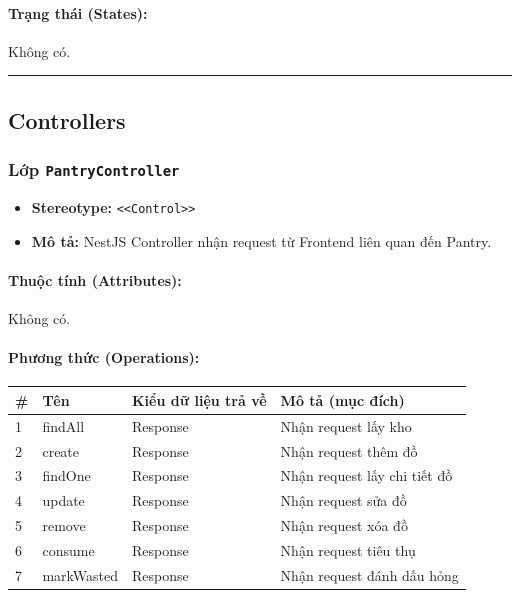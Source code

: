 \documentclass[12pt,a4paper]{article}
\begin{document}
\paragraph{Trạng thái (States):}
Không có.

\vskip 0.5cm
\noindent\rule{\textwidth}{0.5pt}
\vskip 0.5cm

\subsection{Controllers}


\subsubsection{Lớp \texttt{PantryController}}

\begin{itemize}[leftmargin=*]
    \item \textbf{Stereotype:} \texttt{\textless{}\textless{}Control\textgreater{}\textgreater{}}
    \item \textbf{Mô tả:} NestJS Controller nhận request từ Frontend liên quan đến Pantry.
\end{itemize}

\paragraph{Thuộc tính (Attributes):}
Không có.

\paragraph{Phương thức (Operations):}
\begin{longtable}{|p{0.6cm}|p{5.0cm}|p{2.8cm}|p{5.4cm}|}
\hline
\textbf{\#} & \textbf{Tên} & \textbf{Kiểu dữ liệu trả về} & \textbf{Mô tả (mục đích)} \\ \hline
\endhead
1 & findAll & Response & Nhận request lấy kho \\ \hline
2 & create & Response & Nhận request thêm đồ \\ \hline
3 & findOne & Response & Nhận request lấy chi tiết đồ \\ \hline
4 & update & Response & Nhận request sửa đồ \\ \hline
5 & remove & Response & Nhận request xóa đồ \\ \hline
6 & consume & Response & Nhận request tiêu thụ \\ \hline
7 & markWasted & Response & Nhận request đánh dấu hỏng \\ \hline
\end{longtable}
\end{document}
